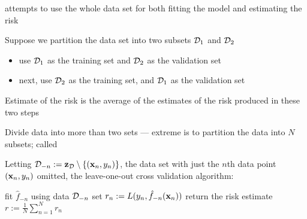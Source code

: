 \begin{frame}

    \vspace{2em}
    attempts to use the whole data set for both fitting the model and estimating
    the risk
    
    \vspace{.7em}
    Suppose we partition the data set
    into two subsets $\mathcal D_1$ and $\mathcal D_2$
    \begin{itemize}
        \item  use $\mathcal D_1$ as the training set and
    $\mathcal D_2$ as the validation set
        \item next, use $\mathcal D_2$ as the training set, and
    $\mathcal D_1$ as the validation set
    \end{itemize}
    
    \vspace{.78em}
    Estimate of the risk is the average of the
    estimates of the risk produced in these two steps
    
\end{frame}

\begin{frame}

    \vspace{2em}
    Divide data into more than two sets --- extreme is
    to partition the data into $N$ subsets; called 
    
    \vspace{.7em}
    Letting
    $\mathcal D_{-n} := \mathbf{z}_{\mathcal D} \setminus \{ ({\mathbf x}_n, y_n) \}$, the data set with just
    the $n$th data point $({\mathbf x}_n, y_n)$ omitted, the leave-one-out cross
    validation algorithm:
    
    \vspace{0.4em}
    \begin{algorithmic}[1]
            \State fit $\hat f_{-n}$ using data $\mathcal D_{-n}$ 
            \State set $r_n := L(y_n, \hat f_{-n}({\mathbf x}_n))$ 
        \EndFor
        \State return the risk estimate $r := \frac{1}{N} \sum_{n=1}^N r_n$
    \end{algorithmic}
    \vspace{0.3em}
    
\end{frame}


